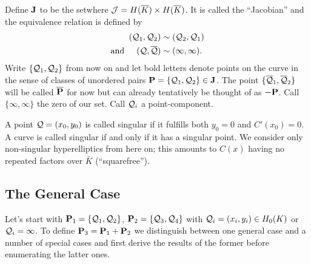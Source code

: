 \documentclass[english,11pt,a4paper]{article}
\begin{document}
\begin{defin}\label{defj}
  Define $\J$ to be the set\scalebox{1.3}{ $\nicefrac{ \j }{\sim }$ }where $\j = \ekb \times \ekb$. It is called the ``Jacobian'' and the equivalence relation is defined by
  \begin{align*}
    (\q_1,\q_2) &\sim (\q_2,\q_1) \\
    \text{and\hspace{5mm}} (\q,\bar \q) & \sim ( \infty , \infty ). 
  \end{align*}
  Write $\{ \q_1,\q_2 \}$ from now on and let bold letters denote points on the curve in the sense of classes of unordered pairs $\P =\{ \q_1, \q_2 \} \in \J$. The point $\{ \bar \q_1, \bar \q_2 \}$ will be called $\bar \P$ for now but can already tentatively be thought of as $-\P$. Call $\{ \infty, \infty \}$ the zero of our set. Call $\q_i$ a point-component.

  A point $\q = (x_0,y_0)$ is called singular if it fulfills both $y_0=0$ and $C'(x_0) = 0$. A curve is called singular if and only if it has a singular point. We consider only non-singular hyperelliptics from here on; this amounts to $C(x)$ having no repeated factors over $\bar K$ (``squarefree'').
\end{defin}

\subsection{The General Case}

Let's start with $\P_1 = \{\q_1,\q_2\}$, $\P_2 = \{\q_3,\q_4\}$ with $\q_i = (x_i,y_i) \in \enk$ or $\q_i = \infty$. To define $\P_3 = \P_1 + \P_2$ we distinguish between one general case and a number of special cases and first derive the results of the former before enumerating the latter ones.
\end{document}
